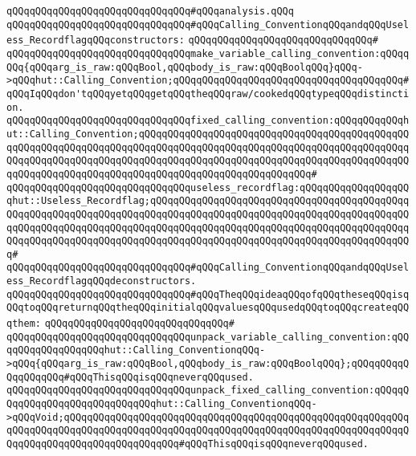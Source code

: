 \verb|qQQqqQQqqQQqqQQqqQQqqQQqqQQqqQQq#qQQqanalysis.qQQq|\newline
\newline
\newline
\verb|qQQqqQQqqQQqqQQqqQQqqQQqqQQqqQQq#qQQqCalling_ConventionqQQqandqQQqUseless_RecordflagqQQqconstructors:|\newline
\verb|qQQqqQQqqQQqqQQqqQQqqQQqqQQqqQQq#|\newline
\verb|qQQqqQQqqQQqqQQqqQQqqQQqqQQqqQQqmake_variable_calling_convention:qQQqqQQq{qQQqarg_is_raw:qQQqBool,qQQqbody_is_raw:qQQqBoolqQQq}qQQq->qQQqhut::Calling_Convention;qQQqqQQqqQQqqQQqqQQqqQQqqQQqqQQqqQQqqQQq#qQQqIqQQqdon'tqQQqyetqQQqgetqQQqtheqQQqraw/cookedqQQqtypeqQQqdistinction.|\newline
\verb|qQQqqQQqqQQqqQQqqQQqqQQqqQQqqQQqfixed_calling_convention:qQQqqQQqqQQqhut::Calling_Convention;qQQqqQQqqQQqqQQqqQQqqQQqqQQqqQQqqQQqqQQqqQQqqQQqqQQqqQQqqQQqqQQqqQQqqQQqqQQqqQQqqQQqqQQqqQQqqQQqqQQqqQQqqQQqqQQqqQQqqQQqqQQqqQQqqQQqqQQqqQQqqQQqqQQqqQQqqQQqqQQqqQQqqQQqqQQqqQQqqQQqqQQqqQQqqQQqqQQqqQQqqQQqqQQqqQQqqQQqqQQqqQQqqQQqqQQqqQQqqQQq#|\newline
\verb|qQQqqQQqqQQqqQQqqQQqqQQqqQQqqQQquseless_recordflag:qQQqqQQqqQQqqQQqqQQqhut::Useless_Recordflag;qQQqqQQqqQQqqQQqqQQqqQQqqQQqqQQqqQQqqQQqqQQqqQQqqQQqqQQqqQQqqQQqqQQqqQQqqQQqqQQqqQQqqQQqqQQqqQQqqQQqqQQqqQQqqQQqqQQqqQQqqQQqqQQqqQQqqQQqqQQqqQQqqQQqqQQqqQQqqQQqqQQqqQQqqQQqqQQqqQQqqQQqqQQqqQQqqQQqqQQqqQQqqQQqqQQqqQQqqQQqqQQqqQQqqQQqqQQqqQQqqQQqqQQqqQQqqQQq#|\newline
\newline
\verb|qQQqqQQqqQQqqQQqqQQqqQQqqQQqqQQq#qQQqCalling_ConventionqQQqandqQQqUseless_RecordflagqQQqdeconstructors.|\newline
\verb|qQQqqQQqqQQqqQQqqQQqqQQqqQQqqQQq#qQQqTheqQQqideaqQQqofqQQqtheseqQQqisqQQqtoqQQqreturnqQQqtheqQQqinitialqQQqvaluesqQQqusedqQQqtoqQQqcreateqQQqthem:|\newline
\verb|qQQqqQQqqQQqqQQqqQQqqQQqqQQqqQQq#|\newline
\verb|qQQqqQQqqQQqqQQqqQQqqQQqqQQqqQQqunpack_variable_calling_convention:qQQqqQQqqQQqqQQqqQQqhut::Calling_ConventionqQQq->qQQq{qQQqarg_is_raw:qQQqBool,qQQqbody_is_raw:qQQqBoolqQQq};qQQqqQQqqQQqqQQqqQQq#qQQqThisqQQqisqQQqneverqQQqused.|\newline
\verb|qQQqqQQqqQQqqQQqqQQqqQQqqQQqqQQqunpack_fixed_calling_convention:qQQqqQQqqQQqqQQqqQQqqQQqqQQqqQQqhut::Calling_ConventionqQQq->qQQqVoid;qQQqqQQqqQQqqQQqqQQqqQQqqQQqqQQqqQQqqQQqqQQqqQQqqQQqqQQqqQQqqQQqqQQqqQQqqQQqqQQqqQQqqQQqqQQqqQQqqQQqqQQqqQQqqQQqqQQqqQQqqQQqqQQqqQQqqQQqqQQqqQQqqQQqqQQqqQQqqQQq#qQQqThisqQQqisqQQqneverqQQqused.|\newline
